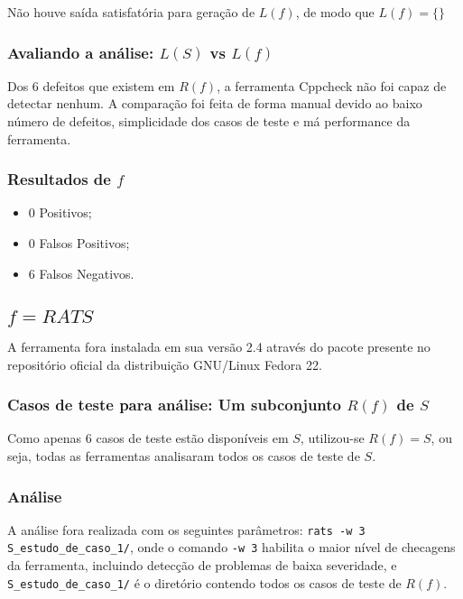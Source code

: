 Não houve saída satisfatória para geração de $L(f)$, de modo que 
$L(f) = \lbrace\rbrace$
\subsubsection{Avaliando a análise: $L(S)$ vs $L(f)$}

Dos 6 defeitos que existem em $R(f)$, a ferramenta Cppcheck não foi capaz de detectar nenhum. A comparação foi feita de forma manual devido ao baixo número de defeitos, simplicidade dos casos de teste e má performance da ferramenta.

\subsubsection{Resultados de $f$}

\begin{itemize}
  \item 0 Positivos;
  \item 0 Falsos Positivos;
  \item 6 Falsos Negativos.
\end{itemize}
\subsection{$f = RATS$}

A ferramenta fora instalada em sua versão 2.4 através do pacote presente no repositório oficial da distribuição GNU/Linux Fedora 22.

\subsubsection{Casos de teste para análise: Um subconjunto $R(f)$ de $S$}

Como apenas 6 casos de teste estão disponíveis em $S$, utilizou-se $R(f) = S$, ou seja, todas as ferramentas analisaram todos os casos de teste de $S$.

\subsubsection{Análise}

A análise fora realizada com os seguintes parâmetros:
\lstinline{rats -w 3 S_estudo_de_caso_1/},
onde o comando \lstinline{-w 3} habilita o maior nível de checagens da ferramenta, incluindo detecção de problemas de baixa severidade, e \lstinline{S_estudo_de_caso_1/} é o diretório contendo todos os casos de teste de $R(f)$.

